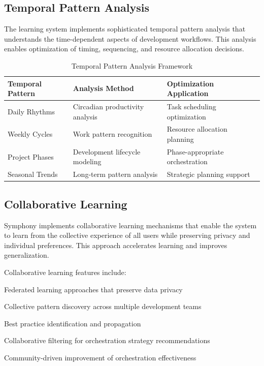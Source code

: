 \subsection*{Temporal Pattern Analysis}

The learning system implements sophisticated temporal pattern analysis that understands the time-dependent aspects of development workflows. This analysis enables optimization of timing, sequencing, and resource allocation decisions.

\begin{table}[ht]
\centering
\begin{tabular}{@{}lll@{}}
\toprule
\textbf{Temporal Pattern} & \textbf{Analysis Method} & \textbf{Optimization Application} \\
\midrule
Daily Rhythms & Circadian productivity analysis & Task scheduling optimization \\
Weekly Cycles & Work pattern recognition & Resource allocation planning \\
Project Phases & Development lifecycle modeling & Phase-appropriate orchestration \\
Seasonal Trends & Long-term pattern analysis & Strategic planning support \\
\bottomrule
\end{tabular}
\caption{Temporal Pattern Analysis Framework}
\end{table}

\subsection*{Collaborative Learning}

Symphony implements collaborative learning mechanisms that enable the system to learn from the collective experience of all users while preserving privacy and individual preferences. This approach accelerates learning and improves generalization.

Collaborative learning features include:

\begin{compactlist}
    \item Federated learning approaches that preserve data privacy
    \item Collective pattern discovery across multiple development teams
    \item Best practice identification and propagation
    \item Collaborative filtering for orchestration strategy recommendations
    \item Community-driven improvement of orchestration effectiveness
\end{compactlist}

